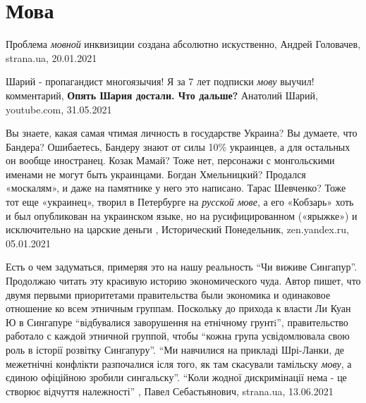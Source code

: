  
 
 
 
 
\chapter{Мова}
\label{sec:slova.mova}

Проблема \emph{мовной} инквизиции создана абсолютно искуственно, Андрей
Головачев, strana.ua, 20.01.2021

Шарий - пропагандист многоязычия! Я за 7 лет подписки \emph{мову} выучил!
комментарий, \textbf{Опять Шария достали. Что дальше?} Анатолий Шарий,
youtube.com, 31.05.2021

Вы знаете, какая самая чтимая личность в государстве Украина? Вы думаете, что
Бандера? Ошибаетесь, Бандеру знают от силы 10\% украинцев, а для остальных он
вообще иностранец. Козак Мамай? Тоже нет, персонажи с монгольскими именами не
могут быть украинцами. Богдан Хмельницкий? Продался «москалям», и даже на
памятнике у него это написано.  Тарас Шевченко? Тоже тот еще «украинец», творил
в Петербурге на \emph{русской мове}, а его «Кобзарь» хоть и был опубликован на
украинском языке, но на русифицированном («ярыжке») и исключительно на царские
деньги
,
Исторический Понедельник, zen.yandex.ru, 05.01.2021 

Есть о чем задуматься, примеряя это на нашу реальность \enquote{Чи виживе
Сингапур}. Продолжаю читать эту красивую историю экономического чуда. Автор
пишет, что двумя первыми приоритетами правительства были экономика и одинаковое
отношение ко всем этничным группам. Поскольку до прихода к власти Ли Куан Ю в
Сингапуре \enquote{відбувалися заворушення на етнічному грунтi}, правительство
работало с каждой этничной группой, чтобы \enquote{кожна група усвідомлювала
свою роль в історії розвітку Сингапуру}. \enquote{Ми навчилися на прикладі
Шрі-Ланки, де межетнічні конфлікти разпочалися ісля того, як там скасували
тамільску \emph{мову}, а єдиною офіційною зробили сингальску}. \enquote{Коли
жодної дискримінації нема - це створює відчуття належності}
, 
Павел Себастьянович, strana.ua, 13.06.2021

